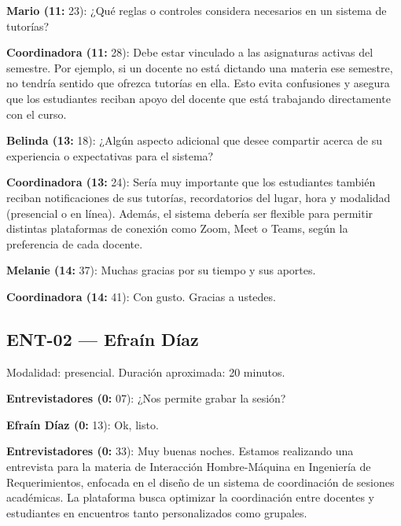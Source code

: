 \noindent\textbf{Mario (11:} 23): ¿Qué reglas o controles considera necesarios en un sistema de tutorías?\par\smallskip

\noindent\textbf{Coordinadora (11:} 28): Debe estar vinculado a las asignaturas activas del semestre. Por ejemplo, si un docente no está dictando una materia ese semestre, no tendría sentido que ofrezca tutorías en ella. Esto evita confusiones y asegura que los estudiantes reciban apoyo del docente que está trabajando directamente con el curso.\par\smallskip

\noindent\textbf{Belinda (13:} 18): ¿Algún aspecto adicional que desee compartir acerca de su experiencia o expectativas para el sistema?\par\smallskip

\noindent\textbf{Coordinadora (13:} 24): Sería muy importante que los estudiantes también reciban notificaciones de sus tutorías, recordatorios del lugar, hora y modalidad (presencial o en línea). Además, el sistema debería ser flexible para permitir distintas plataformas de conexión como Zoom, Meet o Teams, según la preferencia de cada docente.\par\smallskip

\noindent\textbf{Melanie (14:} 37): Muchas gracias por su tiempo y sus aportes.\par\smallskip

\noindent\textbf{Coordinadora (14:} 41): Con gusto. Gracias a ustedes.\par\smallskip

\subsection{ENT-02 — Efraín Díaz}
\label{transcripcion:ent02}

Modalidad: presencial. Duración aproximada: 20 minutos.\par\smallskip

\noindent\textbf{Entrevistadores (0:} 07): ¿Nos permite grabar la sesión?\par\smallskip

\noindent\textbf{Efraín Díaz (0:} 13): Ok, listo.\par\smallskip

\noindent\textbf{Entrevistadores (0:} 33): Muy buenas noches. Estamos realizando una entrevista para la materia de Interacción Hombre-Máquina en Ingeniería de Requerimientos, enfocada en el diseño de un sistema de coordinación de sesiones académicas. La plataforma busca optimizar la coordinación entre docentes y estudiantes en encuentros tanto personalizados como grupales.\par\smallskip

